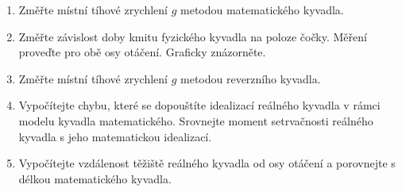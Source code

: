 \documentclass[protokol.tex]{subfiles}
\begin{document}
\begin{enumerate}
\item Změřte místní tíhové zrychlení $g$ metodou matematického kyvadla.
\item Změřte závislost doby kmitu fyzického kyvadla na poloze čočky. Měření proveďte pro obě osy otáčení. Graficky znázorněte.
\item Změřte místní tíhové zrychlení $g$ metodou reverzního kyvadla.
\item Vypočítejte chybu, které se dopouštíte idealizací reálného kyvadla v rámci modelu kyvadla matematického. Srovnejte moment setrvačnosti reálného kyvadla s jeho matematickou idealizací. 
\item Vypočítejte vzdálenost těžiště reálného kyvadla od osy otáčení a porovnejte s délkou matematického kyvadla.
\end{enumerate}
\end{document}
